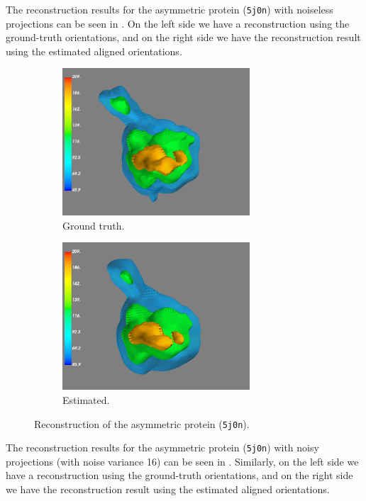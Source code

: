 The reconstruction results for the asymmetric protein (\texttt{5j0n}) with noiseless projections can be seen in . On the left side we have a reconstruction using the ground-truth orientations, and on the right side we have the reconstruction result using the estimated aligned orientations.

\begin{figure}[ht!]
    \centering
    \begin{subfigure}[b]{0.45\textwidth}
        \includegraphics[height=5.5cm]{images/5j0n_reconstruction_GT.png}
        \caption{Ground truth.}
    \end{subfigure}
    \hfill
    \begin{subfigure}[b]{0.5\textwidth}
    \centering
        \includegraphics[height=5.5cm]{images/5j0n_reconstruction_noise0.png}
        \caption{Estimated.}
    \end{subfigure}
    \caption{
        Reconstruction of the asymmetric protein (\texttt{5j0n}).
    }\label{fig:5j0n-reconstruction-noise0}
\end{figure}

The reconstruction results for the asymmetric protein (\texttt{5j0n}) with noisy projections (with noise variance 16) can be seen in .
Similarly, on the left side we have a reconstruction using the ground-truth orientations, and on the right side we have the reconstruction result using the estimated aligned orientations.

